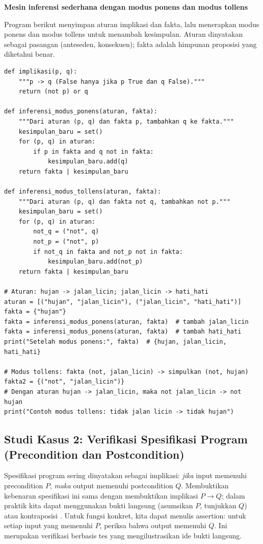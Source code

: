 \begin{contoh}
\textbf{Mesin inferensi sederhana dengan modus ponens dan modus tollens}

Program berikut menyimpan aturan implikasi dan fakta, lalu menerapkan modus ponens dan modus tollens untuk menambah kesimpulan. Aturan dinyatakan sebagai pasangan (anteseden, konsekuen); fakta adalah himpunan proposisi yang diketahui benar.

\begin{lstlisting}[style=pythonstyle, caption={Sistem aturan: modus ponens dan modus tollens untuk menarik kesimpulan}]
def implikasi(p, q):
    """p -> q (False hanya jika p True dan q False)."""
    return (not p) or q

def inferensi_modus_ponens(aturan, fakta):
    """Dari aturan (p, q) dan fakta p, tambahkan q ke fakta."""
    kesimpulan_baru = set()
    for (p, q) in aturan:
        if p in fakta and q not in fakta:
            kesimpulan_baru.add(q)
    return fakta | kesimpulan_baru

def inferensi_modus_tollens(aturan, fakta):
    """Dari aturan (p, q) dan fakta not q, tambahkan not p."""
    kesimpulan_baru = set()
    for (p, q) in aturan:
        not_q = ("not", q)
        not_p = ("not", p)
        if not_q in fakta and not_p not in fakta:
            kesimpulan_baru.add(not_p)
    return fakta | kesimpulan_baru

# Aturan: hujan -> jalan_licin; jalan_licin -> hati_hati
aturan = [("hujan", "jalan_licin"), ("jalan_licin", "hati_hati")]
fakta = {"hujan"}
fakta = inferensi_modus_ponens(aturan, fakta)  # tambah jalan_licin
fakta = inferensi_modus_ponens(aturan, fakta)  # tambah hati_hati
print("Setelah modus ponens:", fakta)  # {hujan, jalan_licin, hati_hati}

# Modus tollens: fakta (not, jalan_licin) -> simpulkan (not, hujan)
fakta2 = {("not", "jalan_licin")}
# Dengan aturan hujan -> jalan_licin, maka not jalan_licin -> not hujan
print("Contoh modus tollens: tidak jalan licin -> tidak hujan")
\end{lstlisting}
\end{contoh}

\subsection*{Studi Kasus 2: Verifikasi Spesifikasi Program (Precondition dan Postcondition)}

Spesifikasi program sering dinyatakan sebagai implikasi: \emph{jika} input memenuhi precondition $P$, \emph{maka} output memenuhi postcondition $Q$. Membuktikan kebenaran spesifikasi ini sama dengan membuktikan implikasi $P \to Q$; dalam praktik kita dapat menggunakan bukti langsung (asumsikan $P$, tunjukkan $Q$) atau kontraposisi \cite{stanford_cs103,berkeley_logic}. Untuk fungsi konkret, kita dapat menulis assertion: untuk setiap input yang memenuhi $P$, periksa bahwa output memenuhi $Q$. Ini merupakan verifikasi berbasis tes yang mengilustrasikan ide bukti langsung.

